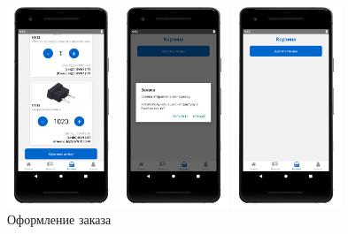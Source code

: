 \begin{figure}[!htb]\centering
    \begin{minipage}{0.24\textwidth}
        \centering

        \includegraphics[height=6cm]
        {images/mobile/order/basket.png}
    \end{minipage}
    \begin{minipage}{0.24\textwidth}
        \centering

        \includegraphics[height=6cm]
        {images/mobile/order/order-make.png}
    \end{minipage}
    \begin{minipage}{0.24\textwidth}
        \centering

        \includegraphics[height=6cm]
        {images/mobile/order/basket-empty.png}
    \end{minipage}

    \caption{Оформление заказа}
    \label{fig:test_order_make}
\end{figure}

